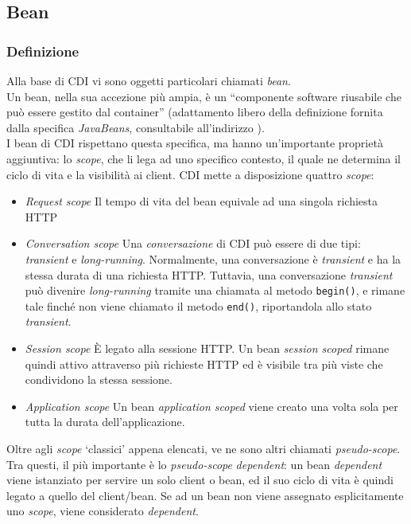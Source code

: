 \subsection{Bean}

\subsubsection{Definizione}
Alla base di CDI vi sono oggetti particolari chiamati \textsl{bean}.\\
Un bean, nella sua accezione più ampia, è un \textquotedblleft componente software riusabile che può essere gestito dal container\textquotedblright{} (adattamento libero della definizione fornita dalla specifica \textsl{JavaBeans}, consultabile all'indirizzo \cite{javaBeans}).\\
I bean di CDI rispettano questa specifica, ma hanno un'importante proprietà aggiuntiva: lo \textit{scope}, che li lega ad uno specifico contesto, il quale ne determina il ciclo di vita e la visibilità ai client.
CDI mette a disposizione quattro \textit{scope}:
\begin{itemize}
\item \textit{Request scope} Il tempo di vita del bean equivale ad una singola richiesta HTTP
\item \textit{Conversation scope} Una \textsl{conversazione} di CDI può essere di due tipi: \textit{transient} e \textit{long-running}. Normalmente, una conversazione è \textit{transient} e ha la stessa durata di una richiesta HTTP. Tuttavia, una conversazione \textit{transient} può divenire \textit{long-running} tramite una chiamata al metodo \lstinline{begin()}, e rimane tale finché non viene chiamato il metodo \lstinline{end()}, riportandola allo stato \textit{transient}.
\item \textit{Session scope} È legato alla sessione HTTP. Un bean \textit{session scoped} rimane quindi attivo attraverso più richieste HTTP ed è visibile tra più viste che condividono la stessa sessione.
\item \textit{Application scope} Un bean \textit{application scoped} viene creato una volta sola per tutta la durata dell'applicazione.
\end{itemize}

Oltre agli \textit{scope} \textquoteleft classici\textquoteright{} appena elencati, ve ne sono altri chiamati \textit{pseudo-scope}. Tra questi, il più importante è lo \textit{pseudo-scope} \textit{dependent}: un bean \textit{dependent} viene istanziato per servire un solo client o bean, ed il suo ciclo di vita è quindi legato a quello del client/bean. Se ad un bean non viene assegnato esplicitamente uno \textit{scope}, viene considerato \textit{dependent}.\\\\

